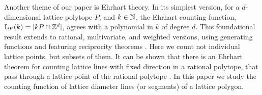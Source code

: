 


Another theme of our paper is Ehrhart theory. In its simplest version, for a $d$-dimensional lattice polytope $P$, and $k \in \mathbb{N}$, the Ehrhart counting function, $\operatorname{L}_P(k) = |kP \cap \mathbb{Z}^d|$, agrees with a polynomial in $k$ of degree $d$. This foundational result extends to rational, multivariate, and weighted versions, using generating functions and featuring reciprocity theorems \cite{beckrobins}. Here we count not individual lattice points, but subsets of them.
It can be shown that there is an Ehrhart theorem for counting lattice lines with fixed direction in a rational polytope, that pass through a lattice point of the rational polytope \cite{aebThesis}.
In this paper we study the counting function of lattice diameter lines (or segments) of a lattice polygon.

